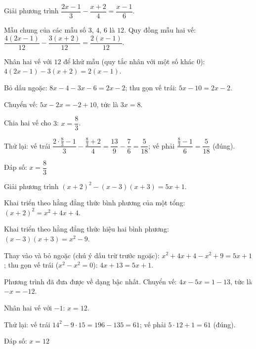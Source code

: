 \begin{problem}[8DS-PT1-004]
Giải phương trình $\dfrac{2x - 1}{3} - \dfrac{x + 2}{4} = \dfrac{x - 1}{6}$.

\begin{solution}
Mẫu chung của các mẫu số $3$, $4$, $6$ là $12$. Quy đồng mẫu hai vế: $\dfrac{4(2x - 1)}{12} - \dfrac{3(x + 2)}{12} = \dfrac{2(x - 1)}{12}$.

Nhân hai vế với $12$ để khử mẫu (quy tắc nhân với một số khác $0$): $4(2x - 1) - 3(x + 2) = 2(x - 1)$.

Bỏ dấu ngoặc: $8x - 4 - 3x - 6 = 2x - 2$; thu gọn vế trái: $5x - 10 = 2x - 2$.

Chuyển vế: $5x - 2x = -2 + 10$, tức là $3x = 8$.

Chia hai vế cho $3$: $x = \dfrac{8}{3}$.

Thử lại: vế trái $\dfrac{2 \cdot \frac{8}{3} - 1}{3} - \dfrac{\frac{8}{3} + 2}{4} = \dfrac{13}{9} - \dfrac{7}{6} = \dfrac{5}{18}$; vế phải $\dfrac{\frac{8}{3} - 1}{6} = \dfrac{5}{18}$ (đúng).

Đáp số: $\boxed{x = \dfrac{8}{3}}$
\end{solution}
\end{problem}

\begin{problem}[8DS-PT1-005]
Giải phương trình $(x + 2)^2 - (x - 3)(x + 3) = 5x + 1$.

\begin{solution}
Khai triển theo hằng đẳng thức bình phương của một tổng: $(x + 2)^2 = x^2 + 4x + 4$.

Khai triển theo hằng đẳng thức hiệu hai bình phương: $(x - 3)(x + 3) = x^2 - 9$.

Thay vào và bỏ ngoặc (chú ý dấu trừ trước ngoặc): $x^2 + 4x + 4 - x^2 + 9 = 5x + 1$; thu gọn vế trái ($x^2 - x^2 = 0$): $4x + 13 = 5x + 1$.

Phương trình đã đưa được về dạng bậc nhất. Chuyển vế: $4x - 5x = 1 - 13$, tức là $-x = -12$.

Nhân hai vế với $-1$: $x = 12$.

Thử lại: vế trái $14^2 - 9 \cdot 15 = 196 - 135 = 61$; vế phải $5 \cdot 12 + 1 = 61$ (đúng).

Đáp số: $\boxed{x = 12}$
\end{solution}
\end{problem}

